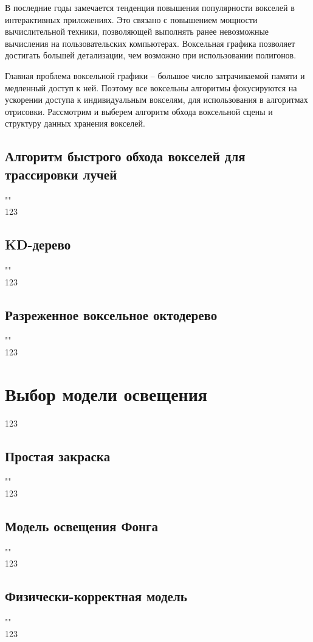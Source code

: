 {В последние годы замечается тенденция повышения популярности вокселей в интерактивных приложениях.
Это связано с повышением мощности вычислительной техники, позволяющей выполнять ранее невозможные
вычисления на пользовательских компьютерах. Воксельная графика позволяет достигать большей детализации,
чем возможно при использовании полигонов. 

Главная проблема воксельной графики -- большое число затрачиваемой памяти и медленный доступ к ней.
Поэтому все воксельны алгоритмы фокусируются на ускорении доступа к индивидуальным вокселям, для
использования в алгоритмах отрисовки. Рассмотрим и выберем алгоритм обхода воксельной сцены и 
структуру данных хранения вокселей.

\subsection{Алгоритм быстрого обхода вокселей для трассировки лучей}""\\
123~\cite{AFVTAfRT}

\subsection{KD-дерево}""\\
123~\cite{KDTASfaGR}

\subsection{Разреженное воксельное октодерево}""\\
123~\cite{ESVOAEaI}

\section{Выбор модели освещения}

123

\subsection{Простая закраска}""\\
123~\cite{Rodzhers}

\subsection{Модель освещения Фонга}""\\
123~\cite{IFCGP}

\subsection{Физически-корректная модель}""\\
123~\cite{PBRT3e}

}
